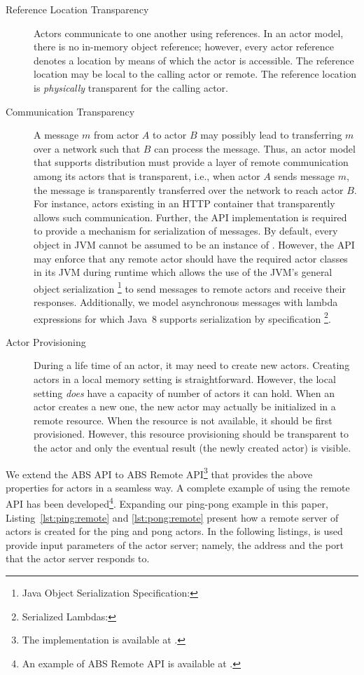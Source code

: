 \begin{description}
\item[Reference Location Transparency] 
Actors communicate to one another using references. 
In an actor model, there is no in-memory object reference; however, every actor reference denotes a location by means of which the actor is accessible.
The reference location may be local to the calling actor or remote.
The reference location is \emph{physically} transparent for the calling actor.
\item[Communication Transparency]
A message $m$ from actor $A$ to actor $B$ may possibly lead to transferring $m$ over a network such that $B$ can process the message.
Thus, an actor model that supports distribution must provide a layer of remote communication among its actors that is transparent, i.e., 
when actor $A$ sends message $m$, the message is transparently transferred over the network to reach actor $B$.
For instance, actors existing in an HTTP container that transparently allows such communication.
Further, the API implementation is required to provide a mechanism for serialization of messages.
By default, every object in JVM cannot be assumed to be an instance of .
However, the API may enforce  that any remote actor should have the required actor classes in its JVM during runtime which
allows the use of the JVM's general object serialization
\footnote{Java Object Serialization Specification: }
to send messages to remote actors and receive their responses.
Additionally, we model asynchronous messages with lambda expressions for which Java~8 supports serialization by specification
\footnote{Serialized Lambdas: }.
\item[Actor Provisioning]
During a life time of an actor, it may need to create new actors.
Creating actors in a local memory setting is straightforward. 
However, the local setting \emph{does} have a capacity of number of actors it can hold.
When an actor creates a new one, the new actor may actually be initialized in a remote resource.
When the resource is not available, it should be first provisioned.
However, this resource provisioning should be transparent to the actor and only the eventual result (the newly created actor) is visible.
\end{description}

We extend the ABS API to ABS Remote API\footnote{The implementation is available at .} 
that provides the above properties for  actors in a seamless way.
A complete example of using the remote API has been developed\footnote{An example of ABS Remote API is available at .}. 
Expanding our ping-pong example in this paper, Listing~\ref{lst:ping:remote} and \ref{lst:pong:remote} present how a remote server of actors is created for the ping and pong actors.
In the following listings,  is used provide input parameters of the actor server;
namely, the address and the port that the actor server responds to.

